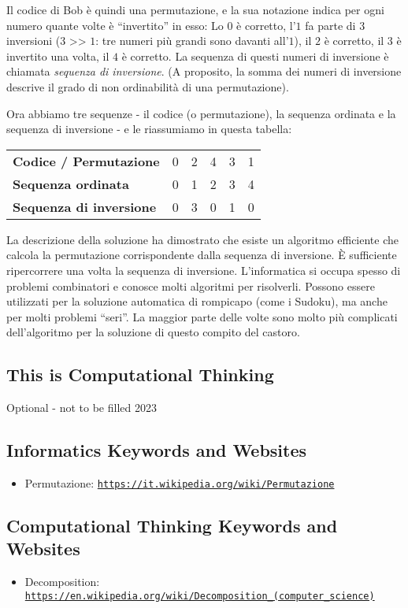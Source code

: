 \documentclass[a4paper,11pt]{report}
\makeatletter
\renewenvironment{adjustwidth}[2]{%
    \begin{list}{}{%
    \partopsep\z@%
    \topsep\z@%
    \listparindent\parindent%
    \parsep\parskip%
    \@ifmtarg{#1}{\setlength{\leftmargin}{\z@}}%
                 {\setlength{\leftmargin}{#1}}%
    \@ifmtarg{#2}{\setlength{\rightmargin}{\z@}}%
                 {\setlength{\rightmargin}{#2}}%
    }
    \item[]}{\end{list}}
\newcommand{\BrochureUrlText}[1]{\texttt{#1}}
\makeatother
\begin{document}
Il codice di Bob è quindi una permutazione, e la sua notazione indica per ogni numero quante volte è \enquote{invertito} in esso:
Lo $0$ è corretto, l’$1$ fa parte di $3$ inversioni ($3$ >\textcompwordmark{}> $1$: tre numeri più grandi sono davanti all’$1$),
il $2$ è corretto, il $3$ è invertito una volta, il $4$ è corretto.
La sequenza di questi numeri di inversione è chiamata \emph{sequenza di inversione}.
(A proposito, la somma dei numeri di inversione descrive il grado di non ordinabilità di una permutazione).

Ora abbiamo tre sequenze - il codice (o permutazione), la sequenza ordinata e la sequenza di inversione - e le riassumiamo in questa tabella:

\begin{adjustwidth}{1.5em}{0em}
\begin{tabular}{ @{} l l l l l l @{} }
  \textbf{Codice / Permutazione} & 0 & 2 & 4 & 3 & 1 \\ 
  \textbf{Sequenza ordinata} & 0 & 1 & 2 & 3 & 4 \\ 
  \textbf{Sequenza di inversione} & 0 & 3 & 0 & 1 & 0
\end{tabular}


\end{adjustwidth}

La descrizione della soluzione ha dimostrato che esiste un algoritmo efficiente che calcola la permutazione corrispondente dalla sequenza di inversione. È sufficiente ripercorrere una volta la sequenza di inversione. L’informatica si occupa spesso di problemi combinatori e conosce molti algoritmi per risolverli. Possono essere utilizzati per la soluzione automatica di rompicapo (come i Sudoku), ma anche per molti problemi \enquote{seri}. La maggior parte delle volte sono molto più complicati dell’algoritmo per la soluzione di questo compito del castoro.


\subsection*{This is Computational Thinking}

Optional - not to be filled 2023


\subsection*{Informatics Keywords and Websites}

\begin{itemize}
  \item Permutazione: \href{https://it.wikipedia.org/wiki/Permutazione}{\BrochureUrlText{https://it.wikipedia.org/wiki/Permutazione}}
\end{itemize}


\subsection*{Computational Thinking Keywords and Websites}

\begin{itemize}
  \item Decomposition: \href{https://en.wikipedia.org/wiki/Decomposition_(computer_science)}{\BrochureUrlText{https://en.wikipedia.org/wiki/Decomposition\_(computer\_science)}}
\end{itemize}
\end{document}
